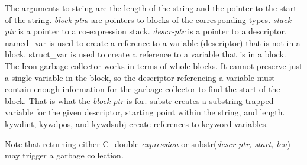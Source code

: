 The arguments to string are the length of the string and the pointer
to the start of the string. \textit{block-ptr}s are pointers to blocks
of the corresponding types. \textit{stack-ptr} is a pointer to a
co-expression stack.  \textit{descr-ptr} is a pointer to a
descriptor. named\_var is used to create a reference to a variable
(descriptor) that is not in a block. struct\_var is used to create a
reference to a variable that is in a block. The Icon garbage collector
works in terms of whole blocks. It cannot preserve just a single
variable in the block, so the descriptor referencing a variable must
contain enough information for the garbage collector to find the start
of the block. That is what the \textit{block-ptr} is for. substr
creates a substring trapped variable for the given descriptor,
starting point within the string, and length. kywdint, kywdpos, and
kywdsubj create references to keyword variables.

Note that returning either C\_double \textit{expression} or
substr(\textit{descr-ptr, start, len}) may trigger a garbage
collection. \newline


\bigskip


\bigskip


\bigskip

